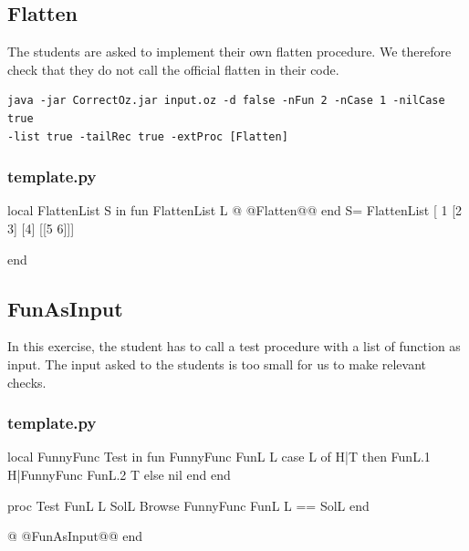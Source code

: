 \documentclass[11pt,a4paper,twoside,openright]{report}
\begin{document}
\subsection{Flatten}
The students are asked to implement their own flatten procedure. We therefore 
check that they do not call the official flatten in their code.
\begin{lstlisting}
java -jar CorrectOz.jar input.oz -d false -nFun 2 -nCase 1 -nilCase true 
-list true -tailRec true -extProc [Flatten] 
\end{lstlisting}

\subsubsection*{template.py}

\begin{OZ}
local FlattenList S in
	fun {FlattenList L}
@	@Flatten@@
	end
	S= {FlattenList [ 1 [2 3] [4] [[5 6]]]}

end
\end{OZ}

%
%

\subsection{FunAsInput}
In this exercise, the student has to call a test procedure with a list of 
function as input. The input asked to the students is too small for us to make 
relevant checks.

\subsubsection*{template.py}
\begin{OZ}
local FunnyFunc Test in 
	fun {FunnyFunc FunL L}
	    case L of H|T then {FunL.1 H}|{FunnyFunc FunL.2 T}
	    else nil
	    end
	end
    
    proc {Test FunL L SolL}
    {Browse {FunnyFunc FunL L} == SolL}
	end
	
@	@FunAsInput@@
end
\end{OZ}
\end{document}
